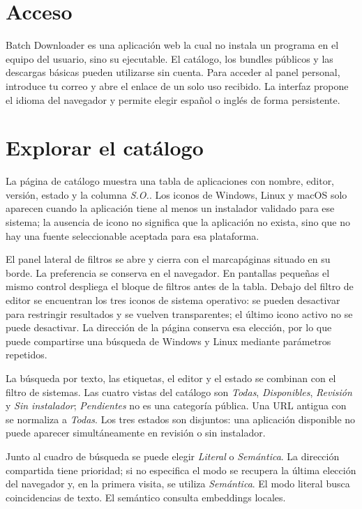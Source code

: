 
\section{Acceso}

Batch Downloader es una aplicación web la cual no instala un programa en el equipo del usuario, sino su ejecutable. El catálogo, los bundles públicos y las descargas básicas pueden utilizarse sin cuenta. Para acceder al panel personal, introduce tu correo y abre el enlace de un solo uso recibido. La interfaz propone el idioma del navegador y permite elegir español o inglés de forma persistente.

\section{Explorar el catálogo}

La página de catálogo muestra una tabla de aplicaciones con nombre, editor, versión, estado y la columna \emph{S.O.}. Los iconos de Windows, Linux y macOS solo aparecen cuando la aplicación tiene al menos un instalador validado para ese sistema; la ausencia de icono no significa que la aplicación no exista, sino que no hay una fuente seleccionable aceptada para esa plataforma.

El panel lateral de filtros se abre y cierra con el marcapáginas situado en su borde. La preferencia se conserva en el navegador. En pantallas pequeñas el mismo control despliega el bloque de filtros antes de la tabla. Debajo del filtro de editor se encuentran los tres iconos de sistema operativo: se pueden desactivar para restringir resultados y se vuelven transparentes; el último icono activo no se puede desactivar. La dirección de la página conserva esa elección, por lo que puede compartirse una búsqueda de Windows y Linux mediante parámetros  repetidos.

La búsqueda por texto, las etiquetas, el editor y el estado se combinan con el filtro de sistemas. Las cuatro vistas del catálogo son \emph{Todas}, \emph{Disponibles}, \emph{Revisión} y \emph{Sin instalador}; \emph{Pendientes} no es una categoría pública. Una URL antigua con  se normaliza a \emph{Todas}. Los tres estados son disjuntos: una aplicación disponible no puede aparecer simultáneamente en revisión o sin instalador.

Junto al cuadro de búsqueda se puede elegir \emph{Literal} o \emph{Semántica}. La dirección compartida tiene prioridad; si no especifica el modo se recupera la última elección del navegador y, en la primera visita, se utiliza \emph{Semántica}. El modo literal busca coincidencias de texto. El semántico consulta embeddings locales.

